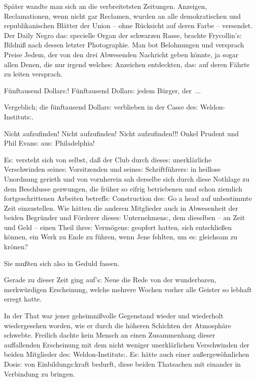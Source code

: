 \documentclass[oneside,12pt]{book}
\newenvironment{antiqua}{\normalfont}{}
\newcommand{\s}{s:}
\begin{document}
Sp\"ater wandte man sich an die verbreitetsten Zeitungen. Anzeigen,
Reclamationen, wenn nicht gar Reclamen, wurden an alle demokratischen
und republikanischen Bl\"atter der Union -- ohne R\"ucksicht auf
deren Farbe -- versendet. Der \begin{antiqua}{\glqq}Daily
Negro{\grqq}\end{antiqua} da{\s} specielle Organ der schwarzen Rasse,
brachte Frycollin'{\s} Bildni{\ss} nach dessen letzter Photographie.
Man bot Belohnungen und versprach Preise Jedem, der von den drei
Abwesenden Nachricht geben k\"onnte, ja sogar allen Denen, die nur
irgend welche{\s} Anzeichen entdeckten, da{\s} auf deren F\"ahrte zu
leiten versprach.

{\glqq}F\"unftausend Dollar{\s}! F\"unftausend Dollar{\s} jedem
B\"urger, der~...{\grqq}

Vergeblich; die f\"unftausend Dollar{\s} verblieben in der Casse
de{\s} Weldon-Institut{\s}.

{\glqq}Nicht aufzufinden! Nicht aufzufinden! Nicht aufzufinden!!!
Onkel Prudent und Phil Evan{\s} au{\s} Philadelphia!{\grqq}

E{\s} versteht sich von selbst, da{\ss} der Club durch diese{\s}
unerkl\"arliche Verschwinden seine{\s} Vorsitzenden und seine{\s}
Schriftf\"uhrer{\s} in heillose Unordnung gerieth und von vornherein
sah derselbe sich durch diese Nothlage zu dem Beschlusse gezwungen,
die fr\"uher so eifrig betriebenen und schon ziemlich
fortgeschrittenen Arbeiten betreff{\s} Construction de{\s}
\begin{antiqua}Go a head\end{antiqua} auf unbestimmte Zeit
einzustellen. Wie h\"atten die anderen Mitglieder auch in Abwesenheit
der beiden Begr\"under und F\"orderer diese{\s} Unternehmen{\s}, dem
dieselben -- an Zeit und Geld -- einen Theil ihre{\s} Verm\"ogen{\s}
geopfert hatten, sich entschlie{\ss}en k\"onnen, ein Werk zu Ende zu
f\"uhren, wenn Jene fehlten, um e{\s} gleichsam zu kr\"onen?

Sie mu{\ss}ten sich also in Geduld fassen.

Gerade zu dieser Zeit ging auf'{\s} Neue die Rede von der
wunderbaren, merkw\"urdigen Erscheinung, welche mehrere Wochen
vorher alle Geister so lebhaft erregt hatte.

In der That war jener geheimni{\ss}volle Gegenstand wieder und
wiederholt wiedergesehen worden, wie er durch die h\"oheren Schichten
der Atmosph\"are schwebte. Freilich dachte kein Mensch an einen
Zusammenhang dieser auf\/fallenden Erscheinung mit dem nicht weniger
unerkl\"arlichen Verschwinden der beiden Mitglieder de{\s}
Weldon-Institut{\s}. E{\s} h\"atte auch einer au{\ss}ergew\"ohnlichen
Dosi{\s} von Einbildung{\s}kraft bedurft, diese beiden Thatsachen mit
einander in Verbindung zu bringen.
\end{document}

